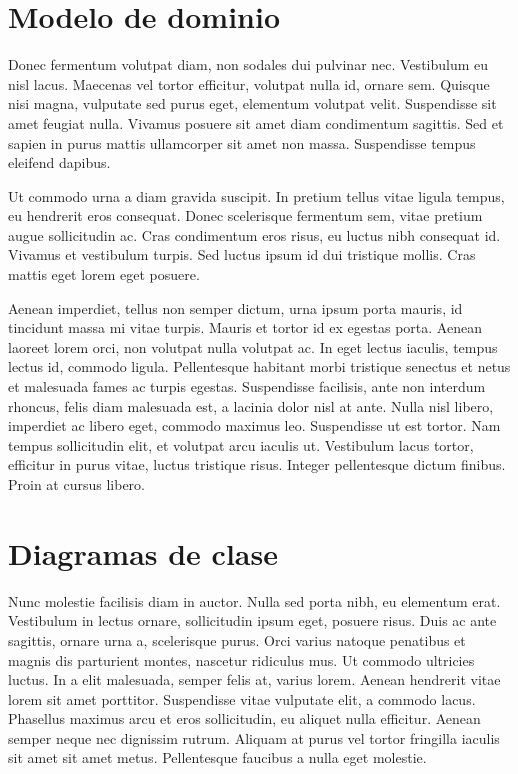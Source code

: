 \documentclass[titlepage,a4paper]{article}
\begin{document}
\section{Modelo de dominio}\label{sec:modelo}

Donec fermentum volutpat diam, non sodales dui pulvinar nec. Vestibulum eu nisl lacus. Maecenas vel tortor efficitur, volutpat nulla id, ornare sem. Quisque nisi magna, vulputate sed purus eget, elementum volutpat velit. Suspendisse sit amet feugiat nulla. Vivamus posuere sit amet diam condimentum sagittis. Sed et sapien in purus mattis ullamcorper sit amet non massa. Suspendisse tempus eleifend dapibus.

Ut commodo urna a diam gravida suscipit. In pretium tellus vitae ligula tempus, eu hendrerit eros consequat. Donec scelerisque fermentum sem, vitae pretium augue sollicitudin ac. Cras condimentum eros risus, eu luctus nibh consequat id. Vivamus et vestibulum turpis. Sed luctus ipsum id dui tristique mollis. Cras mattis eget lorem eget posuere.

Aenean imperdiet, tellus non semper dictum, urna ipsum porta mauris, id tincidunt massa mi vitae turpis. Mauris et tortor id ex egestas porta. Aenean laoreet lorem orci, non volutpat nulla volutpat ac. In eget lectus iaculis, tempus lectus id, commodo ligula. Pellentesque habitant morbi tristique senectus et netus et malesuada fames ac turpis egestas. Suspendisse facilisis, ante non interdum rhoncus, felis diam malesuada est, a lacinia dolor nisl at ante. Nulla nisl libero, imperdiet ac libero eget, commodo maximus leo. Suspendisse ut est tortor. Nam tempus sollicitudin elit, et volutpat arcu iaculis ut. Vestibulum lacus tortor, efficitur in purus vitae, luctus tristique risus. Integer pellentesque dictum finibus. Proin at cursus libero.

\section{Diagramas de clase}\label{sec:diagramasdeclase}

Nunc molestie facilisis diam in auctor. Nulla sed porta nibh, eu elementum erat. Vestibulum in lectus ornare, sollicitudin ipsum eget, posuere risus. Duis ac ante sagittis, ornare urna a, scelerisque purus. Orci varius natoque penatibus et magnis dis parturient montes, nascetur ridiculus mus. Ut commodo ultricies luctus. In a elit malesuada, semper felis at, varius lorem. Aenean hendrerit vitae lorem sit amet porttitor. Suspendisse vitae vulputate elit, a commodo lacus. Phasellus maximus arcu et eros sollicitudin, eu aliquet nulla efficitur. Aenean semper neque nec dignissim rutrum. Aliquam at purus vel tortor fringilla iaculis sit amet sit amet metus. Pellentesque faucibus a nulla eget molestie.
\end{document}
